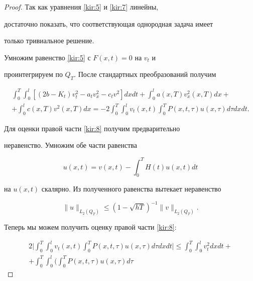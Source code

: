 \begin{proof} Так как уравнения \eqref{kir:5} и \eqref{kir:7} линейны, 

достаточно показать, что соответствующая однородная задача имеет

только тривиальное решение.



Умножим равенство \eqref{kir:5} с $F(x,t)=0$ на $v_t$ и

проинтегрируем по $Q_T$. После стандартных преобразований получим

\begin{multline}

 \label{kir:8}

 \int _0^T \int _0^l[(2b-K_t)v_t^2-a_tv_x^2-c_tv^2]dxdt+ \int _0^la(x,T)v_x^2(x,T)dx+\\

+ \int _0^lc(x,T)v^2(x,T)dx=

-2 \int _0^T \int _0^lv_t(x,t) \int _0^TP(x,t,\tau)u(x,\tau)d\tau

dxdt.

\end{multline}

Для оценки правой части \eqref{kir:8} получим предварительно

неравенство. Умножим обе части равенства

$$

u(x,t)=v(x,t)- \int _0^TH(t)u(x,t)dt

$$

на $u(x,t)$ скалярно. Из полученного равенства вытекает неравенство

\begin{equation}

 \label{kir:9}

\|u\|_{L_2(Q_T)}\leq {(1-\sqrt{hT})^{-1}}\|v\|_{L_2(Q_T)}.

\end{equation}



Теперь мы можем получить оценку правой части \eqref{kir:8}:

\begin{multline*}

2\biggl| \int _0^T \int _0^lv_t(x,t) \int _0^TP(x,t,\tau)u(x,\tau)d\tau

dxdt\biggr|\leq  \int _0^T \int _0^lv_t^2dxdt+\\

+ \int _0^T \int _0^l\biggl( \int _0^TP(x,t,\tau)u(x,\tau)d\tau


\end{multline*}
\end{proof}
